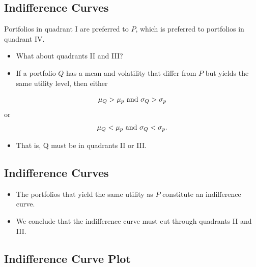 \documentclass[letterpaper,10pt,english]{sphinxmanual}
\begin{document}
\subsection{Indifference Curves}
\label{allocation:indifference-curves}
Portfolios in quadrant I are preferred to $P$, which is preferred to
portfolios in quadrant IV.
\begin{itemize}
\item {} 
What about quadrants II and III?

\end{itemize}
\begin{itemize}
\item {} 
If a portfolio $Q$ has a mean and volatility that differ from
$P$ but yields the same utility level, then either

\end{itemize}
\begin{gather}
\begin{split}\mu_Q > \mu_p \text{  and  } \sigma_Q > \sigma_p\end{split}\notag
\end{gather}
or
\begin{gather}
\begin{split}\mu_Q < \mu_p \text{  and  } \sigma_Q < \sigma_p.\end{split}\notag
\end{gather}\begin{itemize}
\item {} 
That is, Q must be in quadrants II or III.

\end{itemize}


\subsection{Indifference Curves}
\label{allocation:id3}\begin{itemize}
\item {} 
The portfolios that yield the same utility as $P$ constitute
an indifference curve.

\end{itemize}
\begin{itemize}
\item {} 
We conclude that the indifference curve must cut through quadrants
II and III.

\end{itemize}


\subsection{Indifference Curve Plot}
\label{allocation:indifference-curve-plot}
$\qquad$
\end{document}
